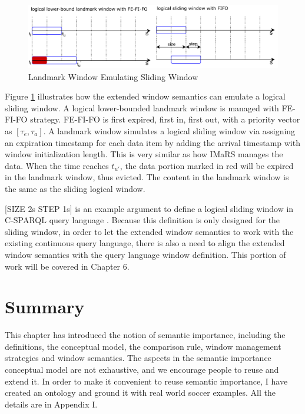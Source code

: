 \begin{figure}[!htbp]
	\centering
    \includegraphics[width=5in]{img/3-lwcsw.pdf}
    \caption{Landmark Window Emulating Sliding Window}
    \label{fig:lwesw}
\end{figure}

Figure \ref{fig:lwesw} illustrates how the extended window semantics can emulate a logical sliding window.
A logical lower-bounded landmark window is managed with FE-FI-FO strategy.
FE-FI-FO is first expired, first in, first out, with a priority vector as $[\tau_{e}, \tau_{a}]$. 
A landmark window simulates a logical sliding window via assigning an expiration timestamp for each data item by adding the arrival timestamp with window initialization length.
This is very similar as how IMaRS \cite{barbieri2010incremental} manages the data. 
When the time reaches $t_{u'}$, the data portion marked in red will be expired in the landmark window, thus evicted. 
The content in the landmark window is the same as the sliding logical window. 

[SIZE 2s STEP 1s] is an example argument to define a logical sliding window in C-SPARQL query language \cite{barbieri2009c}.
Because this definition is only designed for the sliding window, in order to let the extended window semantics to work with the existing continuous query language, there is also a need to align the extended window semantics with the query language window definition.
This portion of work will be covered in Chapter 6. 
%
\section{Summary}
This chapter has introduced the notion of semantic importance, including the definitions, the conceptual model, the comparison rule, window management strategies and window semantics. 
The aspects in the semantic importance conceptual model are not exhaustive, and we encourage people to reuse and extend it. 
In order to make it convenient to reuse semantic importance, I have created an ontology and ground it with real world soccer examples. 
All the details are in Appendix I. 


